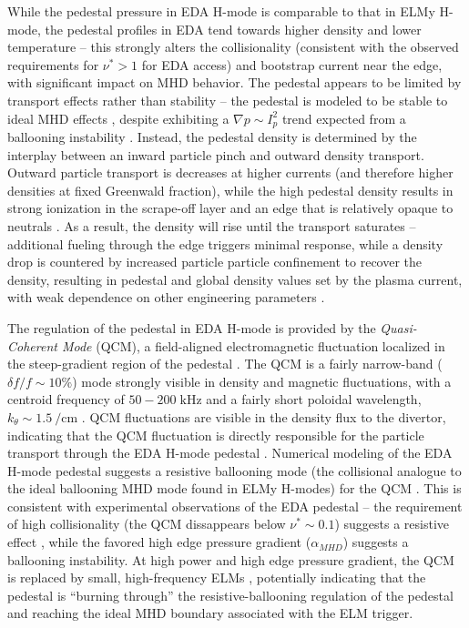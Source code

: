 While the pedestal pressure in EDA H-mode is comparable to that in ELMy H-mode, the pedestal profiles in EDA tend towards higher density and lower temperature -- this strongly alters the collisionality (consistent with the observed requirements for $\nu^* > 1$ for EDA access) and bootstrap current near the edge, with significant impact on MHD behavior.  The pedestal appears to be limited by transport effects rather than stability -- the pedestal is modeled to be stable to ideal MHD effects \cite{Mossessian2002,Hughes2013}, despite exhibiting a $\nabla p \sim I_p^2$ trend expected from a ballooning instability \cite{Hughes2006}.  Instead, the pedestal density is determined by the interplay between an inward particle pinch and outward density transport.  Outward particle transport is decreases at higher currents (and therefore higher densities at fixed Greenwald fraction), while the high pedestal density results in strong ionization in the scrape-off layer and an edge that is relatively opaque to neutrals \cite{Hubbard2007,Greenwald2007}.  As a result, the density will rise until the transport saturates -- additional fueling through the edge triggers minimal response, while a density drop is countered by increased particle particle confinement to recover the density, resulting in pedestal and global density values set by the plasma current, with weak dependence on other engineering parameters \cite{Hughes2007}.

The regulation of the pedestal in EDA H-mode is provided by the \emph{Quasi-Coherent Mode} (QCM), a field-aligned electromagnetic fluctuation localized in the steep-gradient region of the pedestal \cite{Hubbard2001,Terry2005,Mossessian2003}.  The QCM is a fairly narrow-band ($\delta f/f \sim 10\%$) mode strongly visible in density and magnetic fluctuations, with a centroid frequency of $50-200\;\si{\kilo\hertz}$ and a fairly short poloidal wavelength, $k_\theta \sim \SI{1.5}{\per\centi\meter}$ \cite{Terry2005}.  QCM fluctuations are visible in the density flux to the divertor, indicating that the QCM fluctuation is directly responsible for the particle transport through the EDA H-mode pedestal \cite{Greenwald2007,Terry2005}.  Numerical modeling of the EDA H-mode pedestal suggests a resistive ballooning mode (the collisional analogue to the ideal ballooning MHD mode found in ELMy H-modes) for the QCM \cite{Mazurenko2002,Hughes2007a}.  This is consistent with experimental observations of the EDA pedestal -- the requirement of high collisionality (the QCM dissappears below $\nu^* \sim 0.1$) suggests a resistive effect \cite{Hughes2013}, while the favored high edge pressure gradient ($\alpha_{MHD}$) suggests a ballooning instability.  At high power and high edge pressure gradient, the QCM is replaced by small, high-frequency ELMs \cite{Mossessian2002,Mossessian2003,Hughes2007a}, potentially indicating that the pedestal is ``burning through'' the resistive-ballooning regulation of the pedestal and reaching the ideal MHD boundary associated with the ELM trigger.

